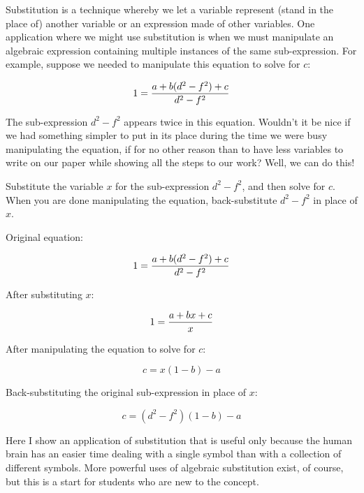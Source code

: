 

Substitution is a technique whereby we let a variable represent (stand in the place of) another variable or an expression made of other variables.  One application where we might use substitution is when we must manipulate an algebraic expression containing multiple instances of the same sub-expression.  For example, suppose we needed to manipulate this equation to solve for $c$:

$$1 = {{a + b(d^2 - f^2) + c} \over {d^2 - f^2}}$$

The sub-expression $d^2 - f^2$ appears twice in this equation.  Wouldn't it be nice if we had something simpler to put in its place during the time we were busy manipulating the equation, if for no other reason than to have less variables to write on our paper while showing all the steps to our work?  Well, we can do this!

Substitute the variable $x$ for the sub-expression $d^2 - f^2$, and then solve for $c$.  When you are done manipulating the equation, back-substitute $d^2 - f^2$ in place of $x$.







Original equation:

$$1 = {{a + b(d^2 - f^2) + c} \over {d^2 - f^2}}$$

\vskip 20pt

After substituting $x$:

$$1 = {{a + bx + c} \over x}$$

\vskip 20pt

After manipulating the equation to solve for $c$:

$$c = x(1-b) - a$$

\vskip 20pt

Back-substituting the original sub-expression in place of $x$:

$$c = (d^2-f^2)(1-b) - a$$







Here I show an application of substitution that is useful only because the human brain has an easier time dealing with a single symbol than with a collection of different symbols.  More powerful uses of algebraic substitution exist, of course, but this is a start for students who are new to the concept.




